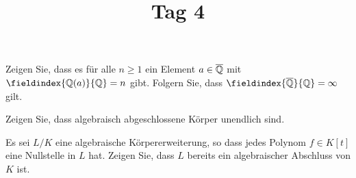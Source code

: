 \documentclass[a4paper, 10pt]{scrartcl}
\title{Tag 4}
\author{}
\date{}
\begin{document}
\begin{question}
  Zeigen Sie, dass es für alle $n \geq 1$ ein Element $a \in \overline{\mathbb{Q}}$ mit $\fieldindex{\Rational(a)}{\Rational} = n$ gibt.
  Folgern Sie, dass $\fieldindex{\closure{\Rational}}{\Rational} = \infty$ gilt.
\end{question}

\begin{question}
  Zeigen Sie, dass algebraisch abgeschlossene Körper unendlich sind.
\end{question}

\begin{question}
  Es sei $L/K$ eine algebraische Körpererweiterung, so dass jedes Polynom $f \in K[t]$ eine Nullstelle in $L$ hat.
  Zeigen Sie, dass $L$ bereits ein algebraischer Abschluss von $K$ ist.
\end{question}
\end{document}
